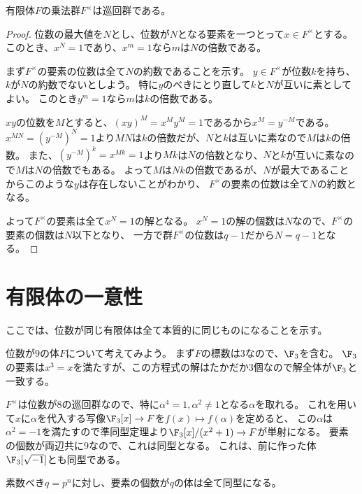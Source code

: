 \documentclass[uplatex]{jsarticle}
\begin{document}
\begin{prop}
  有限体$F$の乗法群$F^\times$は巡回群である。
\end{prop}

\begin{proof}
  位数の最大値を$N$とし、位数が$N$となる要素を一つとって$x\in F^\times$とする。
  このとき、$x^N=1$であり、$x^m=1$なら$m$は$N$の倍数である。

  まず$F^\times$の要素の位数は全て$N$の約数であることを示す。
  $y\in F^\times$が位数$k$を持ち、$k$が$N$の約数でないとしよう。
  特に$y$のべきにとり直して$k$と$N$が互いに素としてよい。
  このとき$y^m=1$なら$m$は$k$の倍数である。

  $xy$の位数を$M$とすると、$(xy)^M=x^My^M=1$であるから$x^M=y^{-M}$である。
  $x^{MN}=(y^{-M})^N=1$より$MN$は$k$の倍数だが、$N$と$k$は互いに素なので$M$は$k$の倍数。
  また、$(y^{-M})^k=x^{Mk}=1$より$Mk$は$N$の倍数となり、$N$と$k$が互いに素なので$M$は$N$の倍数でもある。
  よって$M$は$Nk$の倍数であるが、$N$が最大であることからこのような$y$は存在しないことがわかり、
  $F^\times$の要素の位数は全て$N$の約数となる。

  よって$F^\times$の要素は全て$x^N=1$の解となる。
  $x^N=1$の解の個数は$N$なので、$F^\times$の要素の個数は$N$以下となり、
  一方で群$F^\times$の位数は$q-1$だから$N=q-1$となる。  
\end{proof}

\section{有限体の一意性}

ここでは、位数が同じ有限体は全て本質的に同じものになることを示す。

\begin{eg}
  位数が$9$の体$F$について考えてみよう。
  まず$F$の標数は$3$なので、$\F_3$を含む。
  $\F_3$の要素は$x^3=x$を満たすが、この方程式の解はたかだか$3$個なので解全体が$\F_3$と一致する。

  $F^\times$は位数が$8$の巡回群なので、特に$\alpha^4=1, \alpha^2\neq1$となる$\alpha$を取れる。
  これを用いて$x$に$\alpha$を代入する写像$\F_3[x]\to F$を$f(x)\mapsto f(\alpha)$を定めると、
  この$\alpha$は$\alpha^2=-1$を満たすので準同型定理より$\F_3[x]/(x^2+1)\to F$が単射になる。
  要素の個数が両辺共に$9$なので、これは同型となる。
  これは、前に作った体$\F_3[\sqrt{-1}]$とも同型である。
\end{eg}

\begin{prop}
  素数べき$q=p^n$に対し、要素の個数が$q$の体は全て同型になる。
\end{prop}
\end{document}
